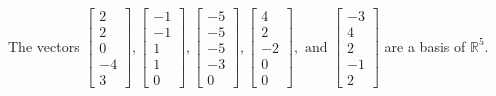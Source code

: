 \begin{exercise}
\begin{exerciseStatement}
  \end{exerciseStatement}
  \begin{exerciseAnswer}
   The vectors \(\left[\begin{array}{r}
2 \\
2 \\
0 \\
-4 \\
3
\end{array}\right] , \left[\begin{array}{r}
-1 \\
-1 \\
1 \\
1 \\
0
\end{array}\right] , \left[\begin{array}{r}
-5 \\
-5 \\
-5 \\
-3 \\
0
\end{array}\right] , \left[\begin{array}{r}
4 \\
2 \\
-2 \\
0 \\
0
\end{array}\right] , \text{ and } \left[\begin{array}{r}
-3 \\
4 \\
2 \\
-1 \\
2
\end{array}\right]\) 
  	 are  a basis of \(\mathbb{R}^5\).
  


  \end{exerciseAnswer}
\end{exercise}